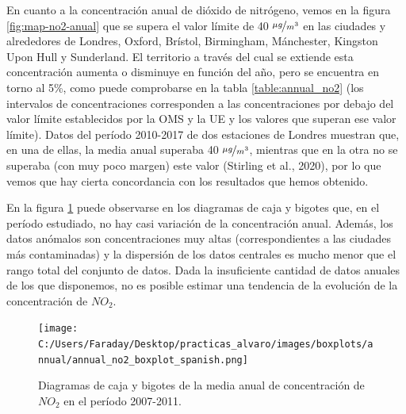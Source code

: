 \documentclass[12pt]{article}
\begin{document}
En cuanto a la concentración anual de dióxido de nitrógeno, vemos en la figura \ref{fig:map-no2-anual} que se supera el valor límite de 40 $\nicefrac{\mu g}{m^3}$ en las ciudades y alrededores de Londres, Oxford, Brístol, Birmingham, Mánchester, Kingston Upon Hull y Sunderland. El territorio a través del cual se extiende esta concentración aumenta o disminuye en función del año, pero se encuentra en torno al 5\%, como puede comprobarse en la tabla \ref{table:annual_no2} (los intervalos de concentraciones corresponden a las concentraciones por debajo del valor límite establecidos por la OMS y la UE y los valores que superan ese valor límite). Datos del período 2010-2017 de dos estaciones de Londres muestran que, en una de ellas, la media anual superaba 40 $\nicefrac{\mu g}{m^3}$, mientras que en la otra no se superaba (con muy poco margen) este valor (Stirling et al., 2020), por lo que vemos que hay cierta concordancia con los resultados que hemos obtenido.

En la figura \ref{fig:box_no2_annual} puede observarse en los diagramas de caja y bigotes que, en el período estudiado, no hay casi variación de la concentración anual. Además, los datos anómalos son concentraciones muy altas (correspondientes a las ciudades más contaminadas) y la dispersión de los datos centrales es mucho menor que el rango total del conjunto de datos. Dada la insuficiente cantidad de datos anuales de los que disponemos, no es posible estimar una tendencia de la evolución de la concentración de $NO_{2}$.

\begin{figure}[H]
\centering
\texttt{[image: C:/Users/Faraday/Desktop/practicas\_alvaro/images/boxplots/annual/annual\_no2\_boxplot\_spanish.png]}
\caption{Diagramas de caja y bigotes de la media anual de concentración de $NO_{2}$ en el período 2007-2011.}
\label{fig:box_no2_annual}
\end{figure}
\end{document}
